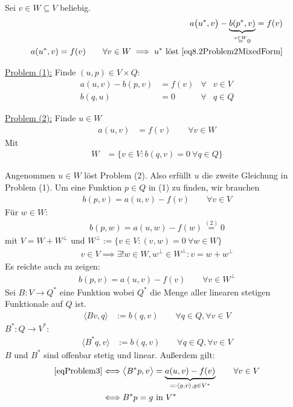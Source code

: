 Sei $v\in W\subseteq V$ beliebig.
\begin{align*}
	a\big(u^\ast,v\big)-\underbrace{b(p^\ast,v)}_{\overset{v\in W}{=}0}=f(v)\\
	a(u^\ast,v)=f(v)\qquad\forall v\in W
	\implies u^\ast\text{ löst }\eqref{eq8.2Problem2MixedForm}
\end{align*}

\underline{Problem (1):}
Finde $(u,p)\in V\times Q:$
\begin{align*}
	a(u,v)-b(p,v)&=f(v) &\forall&v\in V\\
	b(q,u)&=0 &\forall& q\in Q
\end{align*}

\underline{Problem (2):}
Finde $u\in W$
\begin{align*}
	a(u,v)&=f(v) \qquad\forall v\in W
\end{align*}
Mit 
\begin{align*}
	W&=\big\lbrace v\in V:b(q,v)=0~\forall q\in Q\big\rbrace
\end{align*}

Angenommen $u\in W$ löst Problem (2).
Also erfüllt $u$ die zweite Gleichung in Problem (1).
Um eine Funktion $p\in Q$ in (1) zu finden, wir brauchen
\begin{align*}
	b(p,v)=a(u,v)-f(v)\qquad\forall v\in V
\end{align*}
Für $w\in W:$
\begin{align*}
	b(p,w)=a(u,w)-f(w)\overset{(2)}{=}0
\end{align*}
mit $V=W+W^\perp$ und $W^\perp:=\big\lbrace v\in V:(v,w)=0~\forall w\in W\big\rbrace$
\begin{align*}
v\in V\implies\exists! w\in W,w^\perp\in W^\perp:v=w+w^\perp
\end{align*}
Es reichte auch zu zeigen:
\begin{align}\label{eqProblem3}\tag{3}
	b(p,v)=a(u,v)-f(v)\qquad\forall v\in W^\perp
\end{align}
Sei $B:V\to Q^\ast$ eine Funktion wobei $Q^\ast$ die Menge aller linearen stetigen Funktionale auf $Q$ ist.
\begin{align*}
	\langle Bv,q\rangle&:=b(q,v)\qquad\forall q\in Q,\forall v\in V
\end{align*}
$B^\ast:Q\to V^\ast$:
\begin{align*}
	\langle B^\ast q,v\rangle&:=b(q,v)\qquad\forall q\in Q,\forall v\in V
\end{align*}
$B$ und $B^\ast$ sind offenbar stetig und linear.
Außerdem gilt:
\begin{align*}
	\eqref{eqProblem3}&\Longleftrightarrow\big\langle B^\ast p,v\big\rangle
	=\underbrace{a(u,v)-f(v)}_{=:\langle g,v\rangle,g\in V^\ast}\qquad\forall v\in V\\
	&\Longleftrightarrow B^\ast p=g\text{ in }V^\ast
\end{align*}

